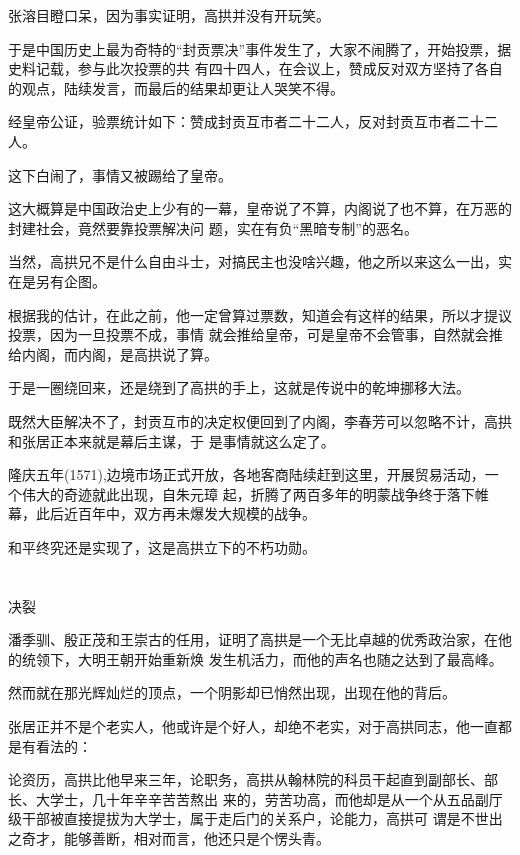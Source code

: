 \documentclass[11pt,a4paper,onecolumn]{article}
\begin{document}
张溶目瞪口呆，因为事实证明，高拱并没有开玩笑。

于是中国历史上最为奇特的``封贡票决''事件发生了，大家不闹腾了，开始投票，据史料记载，参与此次投票的共
有四十四人，在会议上，赞成反对双方坚持了各自的观点，陆续发言，而最后的结果却更让人哭笑不得。

经皇帝公证，验票统计如下：赞成封贡互市者二十二人，反对封贡互市者二十二人。

这下白闹了，事情又被踢给了皇帝。

这大概算是中国政治史上少有的一幕，皇帝说了不算，内阁说了也不算，在万恶的封建社会，竟然要靠投票解决问
题，实在有负``黑暗专制''的恶名。

当然，高拱兄不是什么自由斗士，对搞民主也没啥兴趣，他之所以来这么一出，实在是另有企图。

根据我的估计，在此之前，他一定曾算过票数，知道会有这样的结果，所以才提议投票，因为一旦投票不成，事情
就会推给皇帝，可是皇帝不会管事，自然就会推给内阁，而内阁，是高拱说了算。

于是一圈绕回来，还是绕到了高拱的手上，这就是传说中的乾坤挪移大法。

既然大臣解决不了，封贡互市的决定权便回到了内阁，李春芳可以忽略不计，高拱和张居正本来就是幕后主谋，于
是事情就这么定了。

隆庆五年(1571),边境市场正式开放，各地客商陆续赶到这里，开展贸易活动，一个伟大的奇迹就此出现，自朱元璋
起，折腾了两百多年的明蒙战争终于落下帷幕，此后近百年中，双方再未爆发大规模的战争。

和平终究还是实现了，这是高拱立下的不朽功勋。

\section[\thesection]{}

决裂

潘季驯、殷正茂和王崇古的任用，证明了高拱是一个无比卓越的优秀政治家，在他的统领下，大明王朝开始重新焕
发生机活力，而他的声名也随之达到了最高峰。

然而就在那光辉灿烂的顶点，一个阴影却已悄然出现，出现在他的背后。

张居正并不是个老实人，他或许是个好人，却绝不老实，对于高拱同志，他一直都是有看法的：

论资历，高拱比他早来三年，论职务，高拱从翰林院的科员干起直到副部长、部长、大学士，几十年辛辛苦苦熬出
来的，劳苦功高，而他却是从一个从五品副厅级干部被直接提拔为大学士，属于走后门的关系户，论能力，高拱可
谓是不世出之奇才，能够善断，相对而言，他还只是个愣头青。
\end{document}
